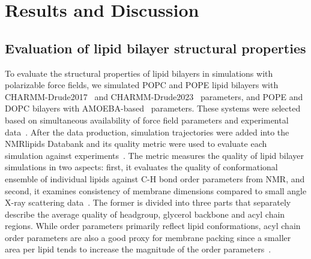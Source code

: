 \documentclass[journal=jctcce,manuscript=article,layout=singlecolumn]{achemso}
\begin{document}
 



 
\section{Results and Discussion}

\subsection{Evaluation of lipid bilayer structural properties}

To evaluate the structural properties of lipid bilayers in simulations with polarizable force fields, we simulated POPC and POPE lipid bilayers with CHARMM-Drude2017~\cite{li2017drude} and CHARMM-Drude2023~\cite{yu2023drude} parameters, and POPE and DOPC bilayers with AMOEBA-based~\cite{chu2018anionicpolarizable,chu2018polarizable} parameters. These systems were selected based on simultaneous availability of force field parameters and experimental data~\cite{Databank}. After the data production, simulation trajectories were added into the NMRlipids Databank and its quality metric were used to evaluate each simulation against experiments~\cite{Databank}. The metric measures the quality of lipid bilayer simulations in two aspects: first, it evaluates the quality of conformational ensemble of individual lipids against C-H bond order parameters from NMR, and second, it examines consistency of membrane dimensions compared to small angle X-ray scattering  data~\cite{Databank,ollila16}. 
The former is divided into three parts that separately describe the average quality of headgroup, glycerol backbone and acyl chain regions. While order parameters primarily reflect lipid conformations, acyl chain order parameters are also a good proxy for membrane packing since a smaller area per lipid tends to increase the magnitude of the order parameters~\cite{Databank}. 

%
\end{document}
